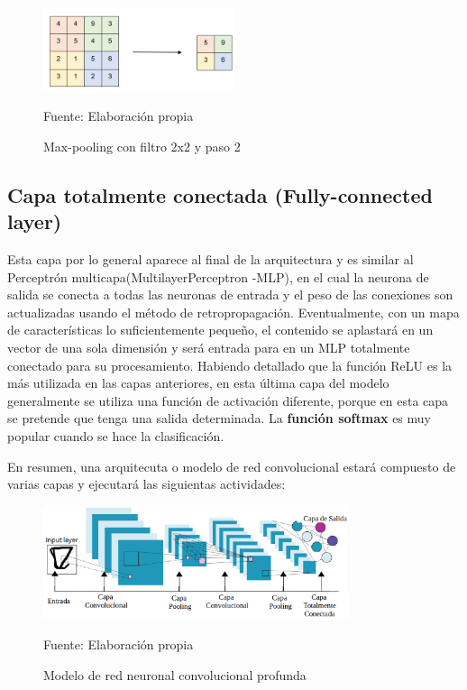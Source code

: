 		\begin{figure}[H]
		\begin{center}
		\includegraphics[width=0.5\textwidth]{images/marcoteorico/pool4}
		\end{center}
		\begin{center}
		\caption{\small{Max-pooling con filtro 2x2 y paso 2}}
		{\small{Fuente: Elaboración propia}}
		\end{center}
		\vspace{-1.5em}
		\end{figure}

	\subsection{Capa totalmente conectada (Fully-connected layer)}

		Esta capa por lo general aparece al final de la arquitectura y es similar al Perceptrón multicapa(MultilayerPerceptron -MLP), en el cual la neurona de salida se conecta a todas las neuronas de entrada y el peso de las conexiones son actualizadas usando el método de retropropagación.
		\vskip 0.4cm  
		Eventualmente, con un mapa de características lo suficientemente pequeño, el contenido se aplastará en un vector de una sola dimensión y será entrada para en un MLP totalmente conectado para su procesamiento.
		\vskip 0.4cm  
		Habiendo detallado que la función ReLU es la más utilizada en las capas anteriores, en esta última capa del modelo generalmente se utiliza una función de activación diferente, porque en esta capa se pretende que tenga una salida determinada. La {\bf función softmax} es muy popular cuando se hace la clasificación.
	


En resumen, una arquitecuta o modelo de red convolucional estará compuesto de varias capas y ejecutará las siguientas actividades:
\begin{figure}[H]
	\begin{center}
	\includegraphics[width=0.8\textwidth]{images/marcoteorico/modelo}
	\end{center}
	\begin{center}
	\caption{\small{Modelo de red neuronal convolucional profunda}}
	{\small{Fuente: Elaboración propia}}
	\end{center}
	\vspace{-1.5em}
	\end{figure}

